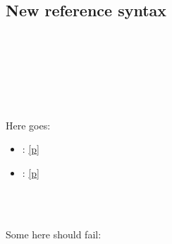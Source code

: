 {\subsection{New reference syntax\label{new-reference-syntax}}%
\label{module-Ocamlary-module-type-M}\begin{ocamlindent}\label{module-Ocamlary-module-type-M-type-t}\\
\end{ocamlindent}%
\\
\label{module-Ocamlary-module-M}\begin{ocamlindent}\label{module-Ocamlary-module-M-type-t}\\
\end{ocamlindent}%
\\
Here goes:

\begin{itemize}\item{ : \hyperref[module-Ocamlary-module-M-type-t]{[p\pageref*{module-Ocamlary-module-M-type-t}]}}%
\item{ : \hyperref[module-Ocamlary-module-type-M-type-t]{[p\pageref*{module-Ocamlary-module-type-M-type-t}]}}\end{itemize}%
\label{module-Ocamlary-module-Only+u+a+u+module}\begin{ocamlindent}\label{module-Ocamlary-module-Only+u+a+u+module-type-t}\\
\end{ocamlindent}%
\\
Some here should fail:

}
